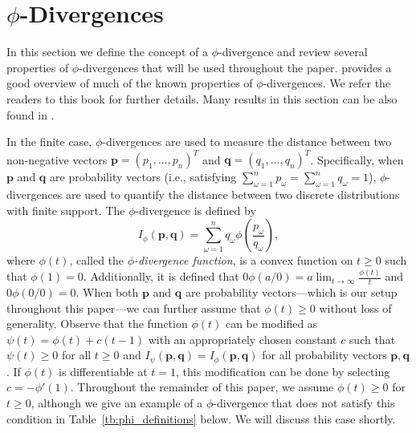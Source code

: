 \documentclass[opre,nonblindrev]{informs3} %
\newcommand{\q}{\mathbf{q}}
\newcommand{\p}{\mathbf{p}}
\begin{document}
\section{$\phi$-Divergences} %
\label{sec:phi_divergences}

In this section we define the concept of a $\phi$-divergence and review several properties of  $\phi$-divergences that will be used throughout the paper. 
\citet{pardo2005statistical} provides a good overview of much of the known properties of $\phi$-divergences. 
We refer the readers to this book for further details.
Many results in this section can be also found in \cite{bental1991certainty,bental2011robust}.

In the finite case, $\phi$-divergences are used to measure the distance between two non-negative vectors $\p = (p_1, \dots, p_n)^T$ and $\q = (q_1, \dots, q_n)^T$.
Specifically, when $\p$ and $\q$ are probability vectors (i.e., satisfying $\sum_{\omega=1}^n p_\omega = \sum_{\omega=1}^n q_\omega = 1$), $\phi$-divergences are used to quantify the distance between two discrete distributions with finite support. 
The $\phi$-divergence is defined by
\[
	I_\phi(\p,\q) = \sum_{\omega=1}^n q_\omega \phi\left(\frac{p_\omega}{q_\omega}\right),
\]
where $\phi(t)$, called the {\it $\phi$-divergence function}, is a convex function on $t \geq 0$ such that $\phi(1) = 0$.
Additionally, it is defined that $0 \phi(a/0) = a \lim_{t \rightarrow \infty} \frac{\phi(t)}{t}$ and $0 \phi(0/0) = 0$.
When both $\p$ and $\q$ are probability vectors---which is our setup throughout this paper---we can further assume that $\phi(t) \geq 0$ without loss of generality. 
Observe that the function $\phi(t)$ can be modified as $\psi(t) = \phi(t) + c(t-1)$ with an appropriately chosen constant $c$ such that $\psi(t) \geq 0$ for all $t\geq 0$ and $I_\psi(\p,\q) = I_\phi(\p,\q)$ for all probability vectors $\p,\q$.
If $\phi(t)$ is differentiable at $t = 1$, this modification can be done by selecting $c = -\phi'(1)$.
Throughout the remainder of this paper, we assume $\phi(t) \geq 0$ for $t\geq 0$, although we give an example of a $\phi$-divergence that does not satisfy this condition in Table~\ref{tb:phi_definitions} below. 
We will discuss this case shortly. 
\end{document}
